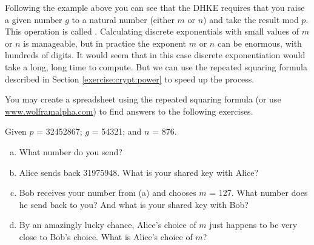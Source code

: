 


Following the example above you can see that the DHKE requires that you raise a given number $g$ to a natural number (either $m$ or $n$) and take the result mod $p$. This operation is called . Calculating discrete exponentials with small values of $m$ or $n$ is manageable, but in practice the exponent $m$ or $n$ can be enormous, with hundreds of digits. It would seem that in this case discrete exponentiation would take a long, long time to compute.  But we can use the repeated squaring formula described in Section \ref{exercise:crypt:power} to speed up the process.  

You may create a spreadsheet using the repeated squaring formula (or use \url{www.wolframalpha.com}) to find answers to the following exercises.
 
\begin{exer}
Given $p$ = 32452867; $g$ = 54321; and $n$ = 876.  
\begin{enumerate}[(a)]
\item What number do you send?  

\item Alice sends back 31975948.  What is your shared key with Alice? 

\item  Bob receives your number from (a) and chooses $m$ = 127. What number does he send back to you? And what is your shared key with Bob?

\item
By an amazingly lucky chance, Alice's choice of $m$ just happens to be very close to Bob's choice.  What is Alice's choice of $m$?
\end{enumerate}
\end{exer}

